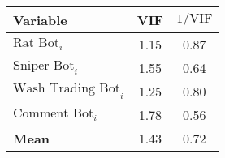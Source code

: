 \begin{tabular}{lcc}
\toprule
Variable & VIF & $1/\text{VIF}$ \\
\midrule
$\text{Rat Bot}_{i}$ & 1.15 & 0.87 \\
$\text{Sniper Bot}_{i}$ & 1.55 & 0.64 \\
$\text{Wash Trading Bot}_{i}$ & 1.25 & 0.80 \\
$\text{Comment Bot}_{i}$ & 1.78 & 0.56 \\
\midrule
\textbf{Mean} & 1.43 & 0.72 \\
\bottomrule
\end{tabular}